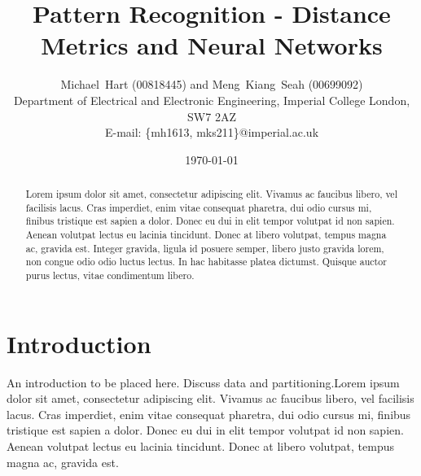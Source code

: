 \documentclass[a4paper, 10pt, conference]{ieeeconf}
\begin{document}
\title{Pattern Recognition - Distance Metrics and Neural Networks}
\author{Michael~Hart (00818445) and
        Meng~Kiang~Seah (00699092)
\\
        Department of Electrical and Electronic Engineering,
        Imperial College London,
        SW7 2AZ
\\
        E-mail: \{mh1613, mks211\}@imperial.ac.uk}
\date{\today}




\maketitle


\begin{abstract}
 Lorem ipsum dolor sit amet, consectetur adipiscing elit. Vivamus ac faucibus libero, vel facilisis lacus. Cras imperdiet, enim vitae consequat pharetra, dui odio cursus mi, finibus tristique est sapien a dolor. Donec eu dui in elit tempor volutpat id non sapien. Aenean volutpat lectus eu lacinia tincidunt. Donec at libero volutpat, tempus magna ac, gravida est. Integer gravida, ligula id posuere semper, libero justo gravida lorem, non congue odio odio luctus lectus. In hac habitasse platea dictumst. Quisque auctor purus lectus, vitae condimentum libero.
\end{abstract}

\section{Introduction}
An introduction to be placed here. Discuss data and partitioning.Lorem ipsum dolor sit amet, consectetur adipiscing elit. Vivamus ac faucibus libero, vel facilisis lacus. Cras imperdiet, enim vitae consequat pharetra, dui odio cursus mi, finibus tristique est sapien a dolor. Donec eu dui in elit tempor volutpat id non sapien. Aenean volutpat lectus eu lacinia tincidunt. Donec at libero volutpat, tempus magna ac, gravida est.
\end{document}
